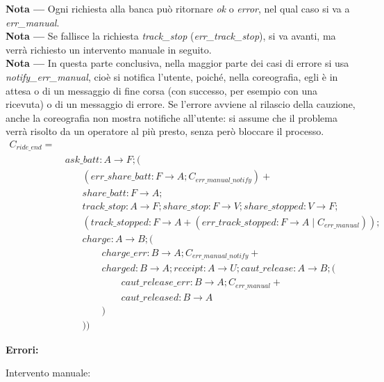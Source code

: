 \textbf{Nota ---} Ogni richiesta alla banca può ritornare \textit{ok} o
\textit{error}, nel qual caso si va a \textit{err\_manual}.\\
\textbf{Nota ---} Se fallisce la richiesta \textit{track\_stop}
(\textit{err\_track\_stop}), si va avanti, ma verrà richiesto un intervento
manuale in seguito.\\
\textbf{Nota ---} In questa parte conclusiva, nella maggior parte dei casi di
errore si usa \textit{notify\_err\_manual}, cioè si notifica l'utente, poiché,
nella coreografia, egli è in attesa o di un messaggio di fine corsa (con
successo, per esempio con una ricevuta) o di un messaggio di errore. Se l'errore
avviene al rilascio della cauzione, anche la coreografia non mostra notifiche
all'utente: si assume che il problema verrà risolto da un operatore al più
presto, senza però bloccare il processo.\\

\begin{align*}
C_{ride\_end} = \\
& \ ask\_batt: A \rightarrow F ; ( \\
& \quad \quad (err\_share\_batt: F \rightarrow A ; C_{err\_manual\_notify}) + \\
& \quad \quad share\_batt: F \rightarrow A ; \\
& \quad \quad track\_stop: A \rightarrow F ; share\_stop: F \rightarrow V ; share\_stopped: V \rightarrow F ; \\
& \quad \quad ( track\_stopped: F \rightarrow A + (err\_track\_stopped: F \rightarrow A \mid C_{err\_manual})) ; \\
& \quad \quad charge: A \rightarrow B ; ( \\
& \quad \quad \quad \quad charge\_err: B \rightarrow A ; C_{err\_manual\_notify} + \\
& \quad \quad \quad \quad charged: B \rightarrow A ; receipt: A \rightarrow U ; caut\_release: A \rightarrow B ; ( \\
& \quad \quad \quad \quad \quad \quad caut\_release\_err: B \rightarrow A ; C_{err\_manual} + \\
& \quad \quad \quad \quad \quad \quad caut\_released: B \rightarrow A \\
& \quad \quad \quad \quad ) \\
& \quad \quad ))
\end{align*}

\textbf{Errori:}

Intervento manuale:\\

